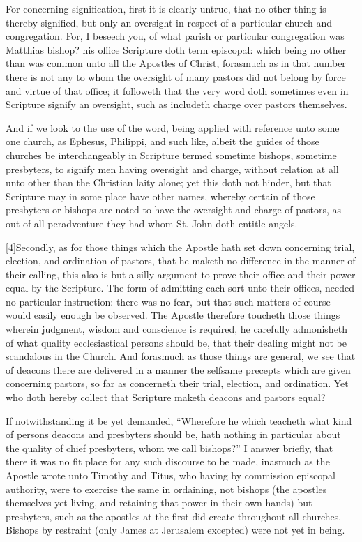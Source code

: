 For concerning signification, first it is clearly untrue, that no other thing is thereby signified, but only an oversight in respect of a particular church and congregation. For, I beseech you, of what parish or particular congregation was Matthias bishop? his office Scripture doth term episcopal: which being no other than was common unto all the Apostles of Christ, forasmuch as in that number there is not any to whom the oversight of many pastors did not belong by force and virtue of that office; it followeth that the very word doth sometimes even in Scripture signify an oversight, such as includeth charge over pastors themselves.

And if we look to the use of the word, being applied with reference unto some one church, as Ephesus, Philippi, and such like, albeit the guides of those churches be interchangeably in Scripture termed sometime bishops, sometime presbyters, to signify men having oversight and charge, without relation at all unto other than the Christian laity alone; yet this doth not hinder, but that Scripture may in some place have other names, whereby certain of those presbyters or bishops are noted to have the oversight and charge of pastors, as out of all peradventure they had whom St. John doth entitle angels.

[4]Secondly, as for those things which the Apostle hath set down concerning trial, election, and ordination of pastors, that he maketh no difference in the manner of their calling, this also is but a silly argument to prove their office and their power equal by the Scripture. The form of admitting each sort unto their offices, needed no particular instruction: there was no fear, but that such matters of course would easily enough be observed. The Apostle therefore toucheth those  things wherein judgment,
 wisdom and conscience is required, he carefully admonisheth of what quality ecclesiastical persons should be, that their dealing might not be scandalous in the Church. And forasmuch as those things are general, we see that of deacons there are delivered in a manner the selfsame precepts which are given concerning pastors, so far as concerneth their trial, election, and ordination. Yet who doth hereby collect that Scripture maketh deacons and pastors equal?

If notwithstanding it be yet demanded, “Wherefore he which teacheth what kind of persons deacons and presbyters should be, hath nothing in particular about the quality of chief presbyters, whom we call bishops?” I answer briefly, that there it was no fit place for any such discourse to be made, inasmuch as the Apostle wrote unto Timothy and Titus, who having by commission episcopal authority, were to exercise the same in ordaining, not bishops (the apostles themselves yet living, and retaining that power in their own hands) but presbyters, such as the apostles at the first did create throughout all churches. Bishops by restraint (only James at Jerusalem excepted) were not yet in being.

